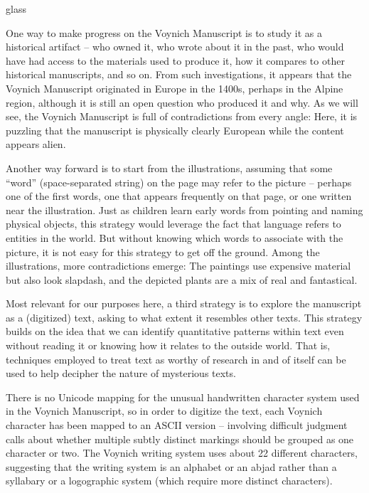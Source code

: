 \begin{tblsfilledsymbol}{}{glass}
\begin{underthehood}
One way to make progress on the Voynich Manuscript is to study it as a
historical artifact -- who owned it, who wrote about it in the past,
who would have had access to the materials used to produce it, how it
compares to other historical manuscripts, and so on.  From such
investigations, it appears that the Voynich Manuscript originated in
Europe in the 1400s, perhaps in the Alpine region, although it is
still an open question who produced it and why. As we will see, the
Voynich Manuscript is full of contradictions from every angle: Here,
it is puzzling that the manuscript is physically clearly European
while the content appears alien.

Another way forward is to start from the illustrations, assuming that
some ``word'' (space-separated string) on the page may refer to the
picture -- perhaps one of the first words, one that appears frequently
on that page, or one written near the illustration.  Just as children
learn early words from pointing and naming physical objects, this
strategy would leverage the fact that language refers to entities in
the world.  But without knowing which words to associate with the
picture, it is not easy for this strategy to get off the ground.
Among the illustrations, more contradictions emerge: The paintings use
expensive material but also look slapdash, and the depicted plants are
a mix of real and fantastical.

Most relevant for our purposes here, a third strategy is to explore
the manuscript as a (digitized) text, asking to what extent it
resembles other texts.  This strategy builds on the idea that we can
identify quantitative patterns within text even without reading it or
knowing how it relates to the outside world. That is, techniques
employed to treat text as worthy of research in and of itself can be
used to help decipher the nature of mysterious texts.

There is no Unicode mapping for the unusual handwritten character
system used in the Voynich Manuscript, so in order to digitize the
text, each Voynich character has been mapped to an ASCII version --
involving difficult judgment calls about whether multiple
subtly distinct markings should be grouped as one character or
two. The Voynich writing system uses about 22 different characters,
suggesting that the writing system is an alphabet or an abjad rather
than a syllabary or a logographic system (which require more distinct
characters).



\end{underthehood}
\end{tblsfilledsymbol}
